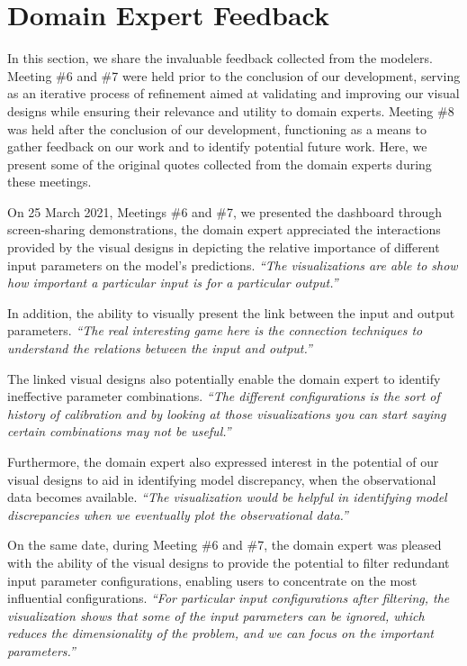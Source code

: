 \section{Domain Expert Feedback}
\label{sec:feedback}
In this section, we share the invaluable feedback collected from the modelers. 
Meeting \#6 and \#7 were held prior to the conclusion of our development, serving as an iterative process of refinement aimed at validating and improving our visual designs while ensuring their relevance and utility to domain experts.
Meeting \#8 was held after the conclusion of our development, functioning as a means to gather feedback on our work and to identify potential future work.
Here, we present some of the original quotes collected from the domain experts during these meetings.


On 25 March 2021, Meetings \#6 and \#7, we presented the dashboard through screen-sharing demonstrations, the domain expert appreciated the interactions provided by the visual designs in depicting the relative importance of different input parameters on the model's predictions.
\textit{``The visualizations are able to show how important a particular input is for a particular output.''
    }

In addition, the ability to visually present the link between the input and output parameters.
\textit{``The real interesting game here is the connection techniques to understand the relations between the input and output.''
}

The linked visual designs also potentially enable the domain expert to identify ineffective parameter combinations.
\textit{``The different configurations is the sort of history of calibration and by looking at those visualizations you can start saying certain combinations may not be useful.''
}

Furthermore, the domain expert also expressed interest in the potential of our visual designs to aid in identifying model discrepancy, when the observational data becomes available.
\textit{``The visualization would be helpful in identifying model discrepancies when we eventually plot the observational data.''
}


On the same date, during Meeting \#6 and \#7, the domain expert was pleased with the ability of the visual designs to provide the potential to filter redundant input parameter configurations, enabling users to concentrate on the most influential configurations.
\textit{``For particular input configurations after filtering, the visualization shows that some of the input parameters can be ignored, which reduces the dimensionality of the problem, and we can focus on the important parameters.''
}

